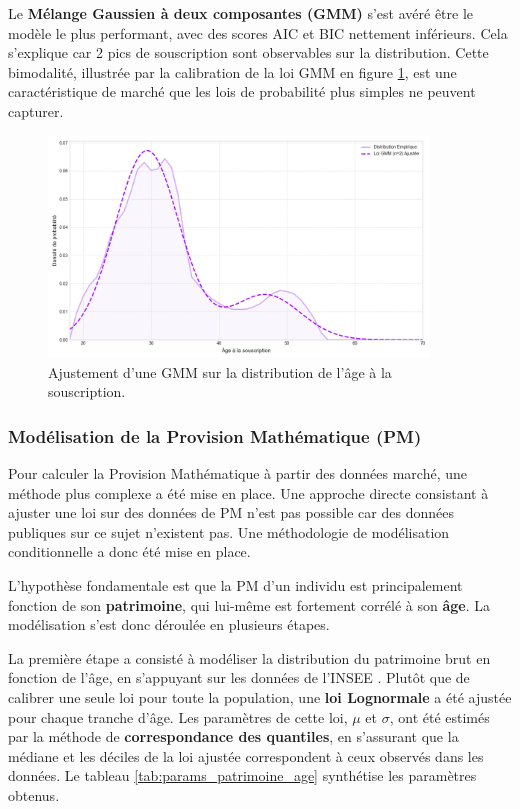 Le \textbf{Mélange Gaussien à deux composantes (GMM)} s'est avéré être le modèle le plus performant, avec des scores AIC et BIC nettement inférieurs. Cela s'explique car 2 pics de souscription sont observables sur la distribution. Cette bimodalité, illustrée par la calibration de la loi GMM en figure \ref{fig:gmm_souscription}, est une caractéristique de marché que les lois de probabilité plus simples ne peuvent capturer.

\begin{figure}[H]
\centering
\includegraphics[width=0.9\textwidth]{images/2_chapitres/chapitre3/calibration_loi_GMM_souscription.png}
\caption{Ajustement d'une GMM sur la distribution de l'âge à la souscription.}
\label{fig:gmm_souscription}
\end{figure}


\subsubsection{Modélisation de la Provision Mathématique (PM)}

Pour calculer la Provision Mathématique à partir des données marché, une méthode plus complexe a été mise en place. Une approche directe consistant à ajuster une loi sur des données de PM n'est pas possible car des données publiques sur ce sujet n'existent pas. Une méthodologie de modélisation conditionnelle a donc été mise en place.

L'hypothèse fondamentale est que la PM d'un individu est principalement fonction de son \textbf{patrimoine}, qui lui-même est fortement corrélé à son \textbf{âge}. La modélisation s'est donc déroulée en plusieurs étapes.


La première étape a consisté à modéliser la distribution du patrimoine brut en fonction de l'âge, en s'appuyant sur les données de l'INSEE \cite{insee_patrimoine_age}. Plutôt que de calibrer une seule loi pour toute la population, une \textbf{loi Lognormale} a été ajustée pour chaque tranche d'âge. Les paramètres de cette loi, $\mu$ et $\sigma$, ont été estimés par la méthode de \textbf{correspondance des quantiles}, en s'assurant que la médiane et les déciles de la loi ajustée correspondent à ceux observés dans les données. Le tableau \ref{tab:params_patrimoine_age} synthétise les paramètres obtenus.

